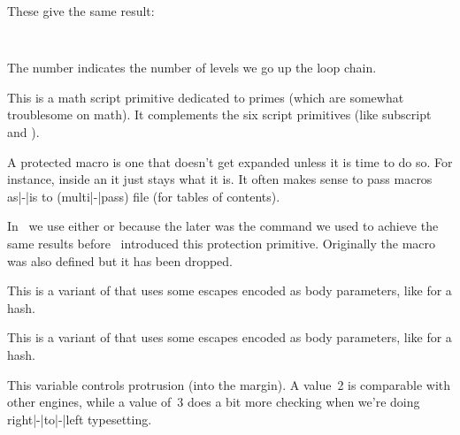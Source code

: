 \typebuffer \getbuffer

These give the same result:

\startlines \tt
\meaningasis\testA
\meaningasis\testB
\stoplines

The number indicates the number of levels we go up the loop chain.

\stopnewprimitive

\startnewprimitive[title={\prm {primescript}}]

This is a math script primitive dedicated to primes (which are somewhat
troublesome on math). It complements the six script primitives (like \prm
{subscript} and ).

\stopnewprimitive

\startoldprimitive[title={\prm {protected}}]

A protected macro is one that doesn't get expanded unless it is time to do so.
For instance, inside an  it just stays what it is. It often makes
sense to pass macros as|-|is to (multi|-|pass) file (for tables of contents).

In \CONTEXT\ we use either  or  because the
later was the command we used to achieve the same results before \ETEX\
introduced this protection primitive. Originally the  macro was
also defined but it has been dropped.

\stopoldprimitive

\startnewprimitive[title={\prm {protecteddetokenize}}]

This is a variant of  that uses some escapes encoded as
body parameters, like \type {#H} for a hash.

\stopnewprimitive

\startnewprimitive[title={\prm {protectedexpandeddetokenize}}]

This is a variant of  that uses some escapes encoded as
body parameters, like \type {#H} for a hash.

\stopnewprimitive

\startnewprimitive[title={\prm {protrudechars}}]

This variable controls protrusion (into the margin). A value~2 is comparable with
other engines, while a value of~3 does a bit more checking when we're doing
right|-|to|-|left typesetting.

\stopnewprimitive

\startnewprimitive[title={\prm {protrusionboundary}}]

